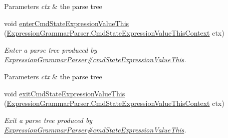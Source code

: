 \begin{DoxyCompactItemize}
\begin{DoxyCompactList}
\begin{DoxyParams}{Parameters}
{\em ctx} & the parse tree\\
\hline
\end{DoxyParams}
 \end{DoxyCompactList}\item 
void \hyperlink{classgov_1_1nasa_1_1jpf_1_1inspector_1_1server_1_1expression_1_1parser_1_1_expression_grammar_base_listener_a755e19943727bfc05fca1680564565cc}{enter\+Cmd\+State\+Expression\+Value\+This} (\hyperlink{classgov_1_1nasa_1_1jpf_1_1inspector_1_1server_1_1expression_1_1parser_1_1_expression_grammar_pa5c670e8752735864512a29116a6ade67}{Expression\+Grammar\+Parser.\+Cmd\+State\+Expression\+Value\+This\+Context} ctx)
\begin{DoxyCompactList}\small\item\em Enter a parse tree produced by \hyperlink{classgov_1_1nasa_1_1jpf_1_1inspector_1_1server_1_1expression_1_1parser_1_1_expression_grammar_parser_accf212342e54a654e9832816edfce8e4}{Expression\+Grammar\+Parser\#cmd\+State\+Expression\+Value\+This}.


\begin{DoxyParams}{Parameters}
{\em ctx} & the parse tree\\
\hline
\end{DoxyParams}
 \end{DoxyCompactList}\item 
void \hyperlink{classgov_1_1nasa_1_1jpf_1_1inspector_1_1server_1_1expression_1_1parser_1_1_expression_grammar_base_listener_a84d1ccbb2885092a8a09945d022d393d}{exit\+Cmd\+State\+Expression\+Value\+This} (\hyperlink{classgov_1_1nasa_1_1jpf_1_1inspector_1_1server_1_1expression_1_1parser_1_1_expression_grammar_pa5c670e8752735864512a29116a6ade67}{Expression\+Grammar\+Parser.\+Cmd\+State\+Expression\+Value\+This\+Context} ctx)
\begin{DoxyCompactList}\small\item\em Exit a parse tree produced by \hyperlink{classgov_1_1nasa_1_1jpf_1_1inspector_1_1server_1_1expression_1_1parser_1_1_expression_grammar_parser_accf212342e54a654e9832816edfce8e4}{Expression\+Grammar\+Parser\#cmd\+State\+Expression\+Value\+This}.



\end{DoxyCompactList}
\end{DoxyCompactItemize}
